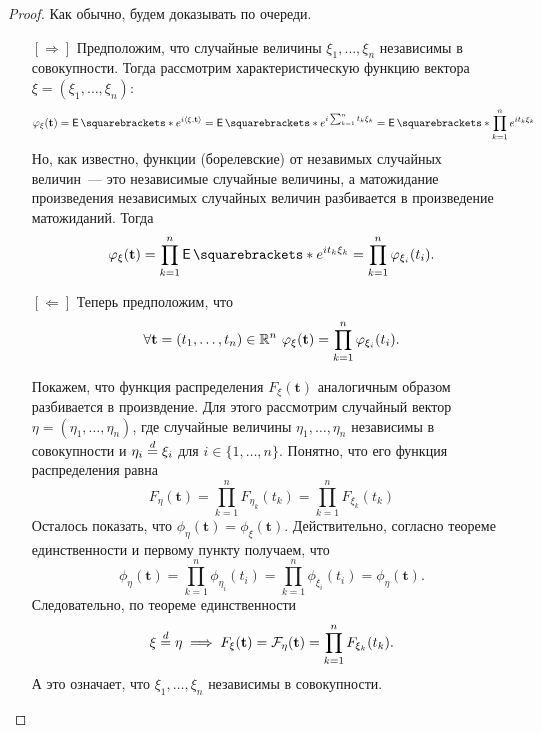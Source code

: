 \begin{proof}
	Как обычно, будем доказывать по очереди.
	\begin{itemize}
		\item[{\([\Rightarrow]\)}] Предположим, что случайные величины \(\xi_{1}, \dots, \xi_{n}\) независимы в совокупности. Тогда рассмотрим характеристическую функцию вектора \(\xi = (\xi_1, \dots, \xi_n)\):
		\[
			\phi_{\xi}(\mathbf{t}) = \E{e^{i\left\langle\xi, \mathbf{t}\right\rangle}} = \E{e^{i\sum_{k = 1}^{n} t_k\xi_k}} = \E{\prod_{k = 1}^{n} e^{it_k\xi_{k}}}
		\]
		Но, как известно, функции (борелевские) от незавимых случайных величин~--- это независимые случайные величины, а матожидание произведения независимых случайных величин разбивается в произведение матожиданий. Тогда
		\[
			\phi_{\xi}(\mathbf{t}) = \prod_{k = 1}^{n} \E{e^{it_k\xi_{k}}} = \prod_{k = 1}^{n} \phi_{\xi_i}(t_i).
		\]
		
		\item[{\([\Leftarrow]\)}] Теперь предположим, что
		\[
			\forall \mathbf{t} = (t_1, \dots, t_n) \in \mathbb{R}^n\ \varphi_{\xi}(\mathbf{t}) = \prod_{k = 1}^{n} \varphi_{\xi_i}(t_i).
		\]
		
		Покажем, что функция распределения \(F_{\xi}(\mathbf{t})\) аналогичным образом разбивается в произвдение. Для этого рассмотрим случайный вектор \(\eta = (\eta_1, \dots, \eta_n)\), где случайные величины \(\eta_1, \dots, \eta_n\) независимы в совокупности и \(\eta_{i} \overset{d}{=} \xi_{i}\) для \(i \in \{1, \dots, n\}\). Понятно, что его функция распределения равна
		\[
			F_{\eta}(\mathbf{t}) = \prod_{k = 1}^{n} F_{\eta_k}(t_k) = \prod_{k = 1}^{n} F_{\xi_k}(t_k)
		\]
		Осталось показать, что \(\phi_{\eta}(\mathbf{t}) = \phi_{\xi}(\mathbf{t})\). Действительно, согласно теореме единственности и первому пункту получаем, что
		\[
			\phi_{\eta}(\mathbf{t}) = \prod_{k = 1}^{n} \phi_{\eta_i}(t_i) = \prod_{k = 1}^{n} \phi_{\xi_i}(t_i) = \phi_{\eta}(\mathbf{t}).
		\]
		Следовательно, по теореме единственности
		\[
			\xi \overset{d}{=} \eta \implies F_{\xi}(\mathbf{t}) = \mathcal{F}_{\eta}(\mathbf{t}) = \prod_{k = 1}^{n} F_{\xi_k}(t_k).
		\]
		А это означает, что \(\xi_{1}, \dots, \xi_{n}\) независимы в совокупности.
	\end{itemize}
\end{proof}

